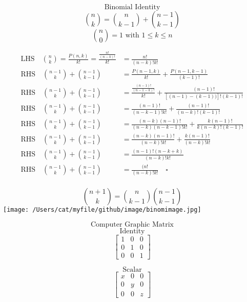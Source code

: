 \documentclass{book}
\begin{document}
\[ \text{Binomial Identity} \] 
\[  \binom{n}{k} = \binom{n}{k-1} + \binom{n-1}{k-1} \] 
\[ \binom{n}{0} = 1 \text{ with } 1 \leq k \leq n\] 

\begin{equation}
\begin{aligned}
    \text{LHS} \quad \binom{n}{k} = \frac{P(n, k)}{k!} = \frac{\frac{n!}{(n-k)!}}{k!} &= \frac{n!}{(n-k)! k!}\\
    \text{RHS} \quad \binom{n-1}{k} + \binom{n-1}{k-1} &= \frac{P(n-1, k)}{k!} + \frac{P(n-1, k-1)}{(k-1)!}  \\  
    \text{RHS} \quad \binom{n-1}{k} + \binom{n-1}{k-1} &= \frac{\frac{(n-1)!}{(n-1-k)!}}{k!} + \frac{(n-1)!}{[(n-1)-(k-1))]!(k-1)!}\\    
    \text{RHS} \quad \binom{n-1}{k} + \binom{n-1}{k-1} &= \frac{(n-1)!}{(n-k-1)!k!} + \frac{(n-1)!}{(n-k)!(k-1)!}\\    
    \text{RHS} \quad \binom{n-1}{k} + \binom{n-1}{k-1} &= \frac{(n-k)(n-1)!}{(n-k)(n-k-1)!k!} + \frac{k(n-1)!}{k(n-k)!(k-1)!}\\    
    \text{RHS} \quad \binom{n-1}{k} + \binom{n-1}{k-1} &= \frac{(n-k)(n-1)!}{(n-k)!k!} + \frac{k(n-1)!}{(n-k)!k!}\\    
    \text{RHS} \quad \binom{n-1}{k} + \binom{n-1}{k-1} &= \frac{(n-1)!(n-k+k)}{(n-k)!k!}\\    
    \text{RHS} \quad \binom{n-1}{k} + \binom{n-1}{k-1} &= \frac{(n!}{(n-k)!k!} \nonumber \quad \square\\    
\end{aligned}
\end{equation}

\newpage
\[  \binom{n+1}{k} = \binom{n}{k-1} \binom{n-1}{k-1} \] 
\texttt{[image: /Users/cat/myfile/github/image/binomimage.jpg]}

\newpage
\[\text{Computer Graphic Matrix} \]
\[\text{Identity}\]
\[
        \begin{bmatrix}
            1 & 0 & 0\\
            0 & 1 & 0\\   
            0 & 0 & 1  
        \end{bmatrix}
\]

\[ \text{Scalar} \]
\[
        \begin{bmatrix}
            x & 0 & 0\\
            0 & y & 0\\   
            0 & 0 & z  
        \end{bmatrix}
\]
\end{document}
